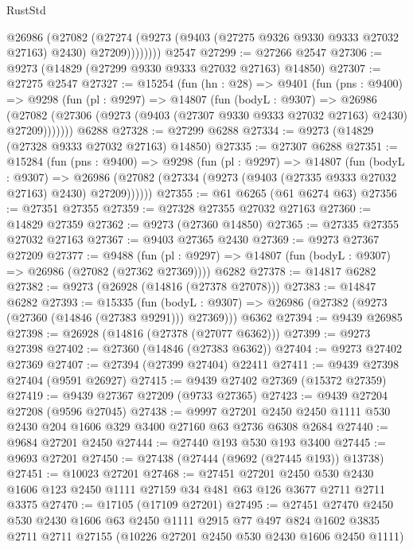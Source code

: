 \begin{lexlean}{RustStd}
\begin{coremodule}
            @26986
              (@27082
                (@27274 (@9273 (@9403 (@27275 @9326 @9330 @9333 @27032 @27163) @2430) @27209))))))))
    @2547
@27299 := @27266 @2547
@27306 := @9273 (@14829 (@27299 @9330 @9333 @27032 @27163) @14850)
@27307 := @27275 @2547
@27327 := @15254
    (fun (hn : @28) =>
    @9401
      (fun (pns : @9400) =>
      @9298
        (fun (pl : @9297) =>
        @14807
          (fun (bodyL : @9307) =>
          @26986
            (@27082 (@27306 (@9273 (@9403 (@27307 @9330 @9333 @27032 @27163) @2430) @27209)))))))
    @6288
@27328 := @27299 @6288
@27334 := @9273 (@14829 (@27328 @9333 @27032 @27163) @14850)
@27335 := @27307 @6288
@27351 := @15284
    (fun (pns : @9400) =>
    @9298
      (fun (pl : @9297) =>
      @14807
        (fun (bodyL : @9307) =>
        @26986 (@27082 (@27334 (@9273 (@9403 (@27335 @9333 @27032 @27163) @2430) @27209))))))
@27355 := @61 @6265 (@61 @6274 @63)
@27356 := @27351 @27355
@27359 := @27328 @27355 @27032 @27163
@27360 := @14829 @27359
@27362 := @9273 (@27360 @14850)
@27365 := @27335 @27355 @27032 @27163
@27367 := @9403 @27365 @2430
@27369 := @9273 @27367 @27209
@27377 := @9488
    (fun (pl : @9297) => @14807 (fun (bodyL : @9307) => @26986 (@27082 (@27362 @27369))))
    @6282
@27378 := @14817 @6282
@27382 := @9273 (@26928 (@14816 (@27378 @27078)))
@27383 := @14847 @6282
@27393 := @15335
    (fun (bodyL : @9307) => @26986 (@27382 (@9273 (@27360 (@14846 (@27383 @9291))) @27369)))
    @6362
@27394 := @9439 @26985
@27398 := @26928 (@14816 (@27378 (@27077 @6362)))
@27399 := @9273 @27398
@27402 := @27360 (@14846 (@27383 @6362))
@27404 := @9273 @27402 @27369
@27407 := @27394 (@27399 @27404) @22411
@27411 := @9439 @27398 @27404 (@9591 @26927)
@27415 := @9439 @27402 @27369 (@15372 @27359)
@27419 := @9439 @27367 @27209 (@9733 @27365)
@27423 := @9439 @27204 @27208 (@9596 @27045)
@27438 := @9997
    @27201
    @2450
    @2450
    @1111
    @530
    @2430
    @204
    @1606
    @329
    @3400
    @27160
    @63
    @2736
    @6308
    @2684
@27440 := @9684 @27201 @2450
@27444 := @27440 @193 @530 @193 @3400
@27445 := @9693 @27201
@27450 := @27438 (@27444 (@9692 (@27445 @193)) @13738)
@27451 := @10023 @27201
@27468 := @27451
    @27201
    @2450
    @530
    @2430
    @1606
    @123
    @2450
    @1111
    @27159
    @34
    @481
    @63
    @126
    @3677
    @2711
    @2711
    @3375
@27470 := @17105 (@17109 @27201)
@27495 := @27451
    @27470
    @2450
    @530
    @2430
    @1606
    @63
    @2450
    @1111
    @2915
    @77
    @497
    @824
    @1602
    @3835
    @2711
    @2711
    @27155
    (@10226 @27201 @2450 @530 @2430 @1606 @2450 @1111)

\end{coremodule}
\end{lexlean}
